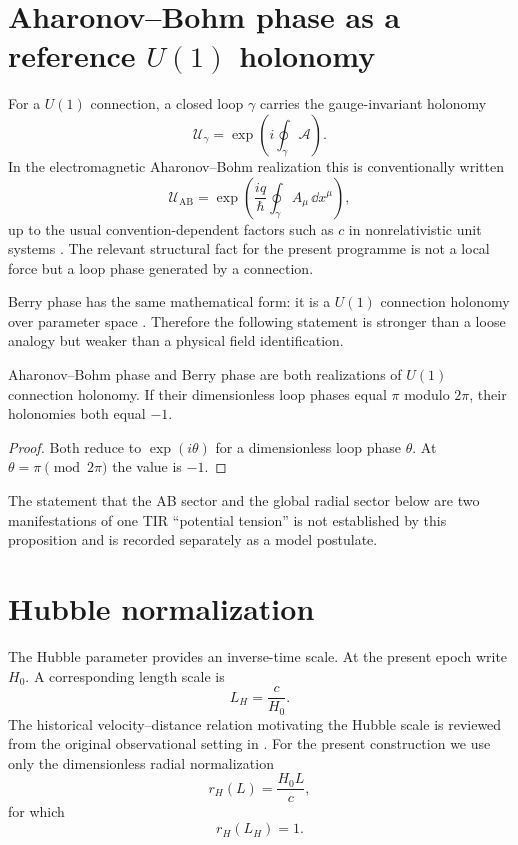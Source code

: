 \section{Aharonov--Bohm phase as a reference $U(1)$ holonomy}
For a $U(1)$ connection, a closed loop $\gamma$ carries the gauge-invariant holonomy
\begin{equation}
\mathcal U_\gamma
=
\exp\left(i\oint_\gamma \mathcal A\right).
\label{eq:u1-holonomy}
\end{equation}
In the electromagnetic Aharonov--Bohm realization this is conventionally written
\begin{equation}
\mathcal U_{\mathrm{AB}}
=
\exp\left(
\frac{i q}{\hbar}
\oint_\gamma A_\mu\,\dd x^\mu
\right),
\label{eq:ab-holonomy}
\end{equation}
up to the usual convention-dependent factors such as $c$ in nonrelativistic unit systems \cite{AharonovBohm1959}.  The relevant structural fact for the present programme is not a local force but a loop phase generated by a connection.

Berry phase has the same mathematical form: it is a $U(1)$ connection holonomy over parameter space \cite{Berry1984,Simon1983}.  Therefore the following statement is stronger than a loose analogy but weaker than a physical field identification.

\begin{proposition}
\label{prop:u1-equivalence}
Aharonov--Bohm phase and Berry phase are both realizations of $U(1)$ connection holonomy.  If their dimensionless loop phases equal $\pi$ modulo $2\pi$, their holonomies both equal $-1$.
\end{proposition}

\begin{proof}
Both reduce to $\exp(i\theta)$ for a dimensionless loop phase $\theta$.  At $\theta=\pi\pmod{2\pi}$ the value is $-1$.
\end{proof}

The statement that the AB sector and the global radial sector below are two manifestations of one TIR ``potential tension'' is not established by this proposition and is recorded separately as a model postulate.

\section{Hubble normalization}
The Hubble parameter provides an inverse-time scale.  At the present epoch write $H_0$.  A corresponding length scale is
\begin{equation}
L_H=\frac{c}{H_0}.
\label{eq:hubble-length}
\end{equation}
The historical velocity--distance relation motivating the Hubble scale is reviewed from the original observational setting in \cite{Hubble1929}.  For the present construction we use only the dimensionless radial normalization
\begin{equation}
r_H(L)
=
\frac{H_0L}{c},
\label{eq:hubble-normalized-radius}
\end{equation}
for which
\begin{equation}
r_H(L_H)=1.
\end{equation}

